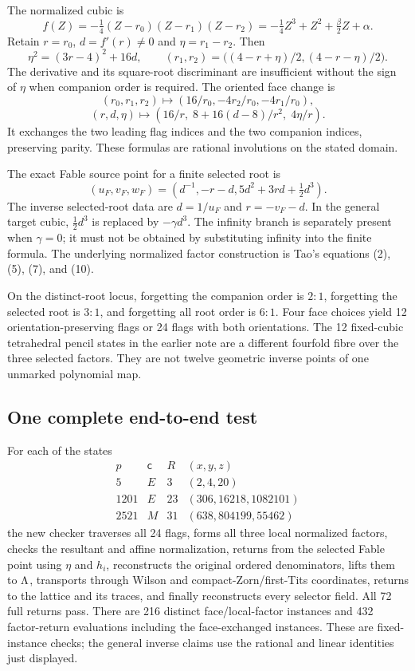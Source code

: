 The normalized cubic is
\[
f(Z)=-\tfrac14(Z-r_0)(Z-r_1)(Z-r_2)
=-\tfrac14Z^3+Z^2+\tfrac\beta2Z+\alpha.
\]
Retain $r=r_0$, $d=f'(r)\ne0$ and $\eta=r_1-r_2$. Then
\[
\eta^2=(3r-4)^2+16d,\qquad
(r_1,r_2)=\bigl((4-r+\eta)/2,(4-r-\eta)/2\bigr).
\]
The derivative and its square-root discriminant are insufficient without the sign of $\eta$ when companion order is required. The oriented face change is
\[
(r_0,r_1,r_2)\mapsto(16/r_0,-4r_2/r_0,-4r_1/r_0),
\]
\[
(r,d,\eta)\mapsto
\left(16/r,\;8+16(d-8)/r^2,\;4\eta/r\right).
\]
It exchanges the two leading flag indices and the two companion indices, preserving parity. These formulas are rational involutions on the stated domain.

The exact Fable source point for a finite selected root is
\[
(u_F,v_F,w_F)=\left(d^{-1},-r-d,5d^2+3rd+\tfrac12d^3\right).
\]
The inverse selected-root data are $d=1/u_F$ and $r=-v_F-d$. In the general target cubic, $\tfrac12d^3$ is replaced by $-\gamma d^3$. The infinity branch is separately present when $\gamma=0$; it must not be obtained by substituting infinity into the finite formula. The underlying normalized factor construction is Tao's equations (2), (5), (7), and (10).

On the distinct-root locus, forgetting the companion order is $2:1$, forgetting the selected root is $3:1$, and forgetting all root order is $6:1$. Four face choices yield 12 orientation-preserving flags or 24 flags with both orientations. The 12 fixed-cubic tetrahedral pencil states in the earlier note are a different fourfold fibre over the three selected factors. They are not twelve geometric inverse points of one unmarked polynomial map.

\subsection{One complete end-to-end test}
For each of the states
\[
\begin{array}{c|c|c|c}
p&\mathsf c&R&(x,y,z)\\\hline
5&E&3&(2,4,20)\\
1201&E&23&(306,16218,1082101)\\
2521&M&31&(638,804199,55462)
\end{array}
\]
the new checker traverses all 24 flags, forms all three local normalized factors, checks the resultant and affine normalization, returns from the selected Fable point using $\eta$ and $h_i$, reconstructs the original ordered denominators, lifts them to $\Lambda$, transports through Wilson and compact-Zorn/first-Tits coordinates, returns to the lattice and its traces, and finally reconstructs every selector field. All 72 full returns pass. There are 216 distinct face/local-factor instances and 432 factor-return evaluations including the face-exchanged instances. These are fixed-instance checks; the general inverse claims use the rational and linear identities just displayed.

